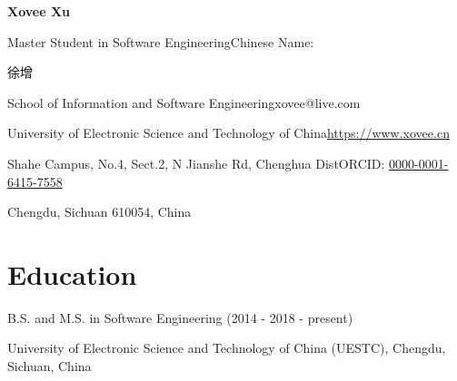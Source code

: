 \documentclass{article}
\begin{document}
\begin{center}
    \Huge{
    \textbf{Xovee Xu}}
\end{center}



\noindent Master Student in Software Engineering\hfill Chinese Name: \begin{CJK*}{UTF8}{gkai}徐增\end{CJK*}

\noindent School of Information and Software Engineering\hfill xovee@live.com

\noindent University of Electronic Science and Technology of China\hfill \url{https://www.xovee.cn}

\noindent Shahe Campus, No.4, Sect.2, N Jianshe Rd, Chenghua Dist\hfill ORCID: \href{https://orcid.org/0000-0001-6415-7558}{0000-0001-6415-7558}

\noindent Chengdu, Sichuan 610054, China

\setlength{\parskip}{3pt}


\vspace{-8pt}
\section*{Education}
\vspace{-4pt}
\indent 


B.S. and M.S. in Software Engineering (2014 - 2018 - present)

University of Electronic Science and Technology of China (UESTC), Chengdu, Sichuan, China






\end{document}
